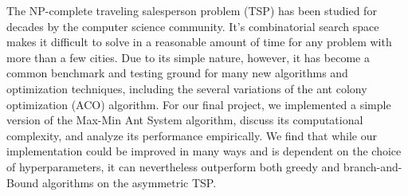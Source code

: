The NP-complete traveling salesperson problem (TSP) has been studied for decades by the
computer science community. It's combinatorial search space makes it difficult to
solve in a reasonable amount of time for any problem with more than a few cities.
Due to its simple nature, however, it has become a common benchmark and testing ground
for many new algorithms and optimization techniques, including the several variations
of the ant colony optimization (ACO) algorithm. For our final project, we implemented a 
simple version of the Max-Min Ant System algorithm, discuss its computational 
complexity, and analyze its performance empirically. We find that while our 
implementation could be improved in many ways and is dependent on the choice
of hyperparameters, it can nevertheless outperform both greedy and branch-and-Bound
algorithms on the asymmetric TSP.

